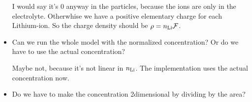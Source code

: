 \documentclass[a4paper,11pt]{scrartcl}
\newcommand*{\Li}{\ce{Li}}
\newcommand*{\n}{n_{\Li}}
\newcommand*{\F}{\mathcal{F}}
\begin{document}
\begin{itemize}
  I would say it's 0 anyway in the particles, because the ions are only in the electrolyte.
  Otherwhise we have a positive elementary charge for each Lithium-ion.
  So the charge density should be $\rho = \n \F$.

\item Can we run the whole model with the normalized concentration?
  Or do we have to use the actual concentration?

  Maybe not, because it's not linear in $\n$.
  The implementation uses the actual concentration now.

\item Do we have to make the concentration 2dimensional by dividing by the area?

\end{itemize}

{}

\end{document}
